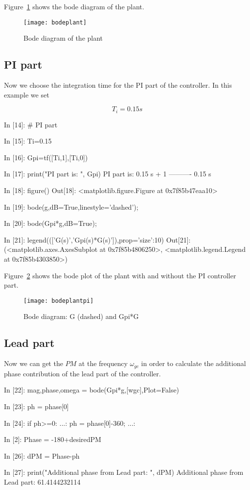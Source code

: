 Figure~\ref{F10} shows the bode diagram of the plant.

\begin{figure}[htbp]	%
\centering
\texttt{[image: bodeplant]}
\caption{Bode diagram of the plant}
\label{F10}
\end{figure}

\subsection{PI part}

Now we choose the integration time for the PI part of the controller. In this 
example we set

$$
T_i=0.15s
$$

\begin{code}
In [14]: # PI part

In [15]: Ti=0.15

In [16]: Gpi=tf([Ti,1],[Ti,0])

In [17]: print("PI part is: ", Gpi)
PI part is:  
0.15 s + 1
----------
  0.15 s


In [18]: figure()
Out[18]: <matplotlib.figure.Figure at 0x7f85b47eaa10>

In [19]: bode(g,dB=True,linestyle='dashed');

In [20]: bode(Gpi*g,dB=True);

In [21]: legend((['G(s)','Gpi(s)*G(s)']),prop={'size':10})
Out[21]: 
(<matplotlib.axes.AxesSubplot at 0x7f85b4806250>,
 <matplotlib.legend.Legend at 0x7f85b4303850>)
\end{code}

Figure~\ref{F11} shows the bode plot of the plant with and without the PI 
controller part.

\begin{figure}[htbp]	%
\centering
\texttt{[image: bodeplantpi]}
\caption{Bode diagram: G (dashed) and Gpi*G}
\label{F11}
\end{figure}

\subsection{Lead part}

Now we can get the $PM$ at the frequency $\omega_{gc}$ in order to calculate 
the additional phase contribution of the lead part of the controller.

\begin{code}
In [22]: mag,phase,omega = bode(Gpi*g,[wgc],Plot=False)

In [23]: ph = phase[0]

In [24]: if ph>=0:
    ...:     ph = phase[0]-360;
    ...:     

In [2]: Phase = -180+desiredPM

In [26]: dPM = Phase-ph

In [27]: print("Additional phase from Lead part: ", dPM)
Additional phase from Lead part:  61.4144232114
\end{code}

